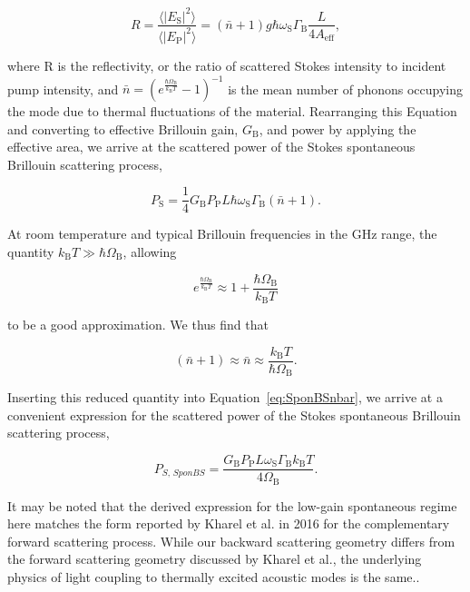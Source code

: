 \begin{equation}
  R = \frac{\langle|E_{\mathrm{S}}|^{2}\rangle}{\langle|E_{\mathrm{P}}|^{2}\rangle} = (\bar{n} + 1)g\hbar\omega_{\mathrm{S}}\Gamma_{\mathrm{B}}\frac{L}{4A_{\mathrm{eff}}},
\end{equation}

where R is the reflectivity, or the ratio of scattered Stokes intensity to incident pump intensity, and \(\bar{n} = (e^{\frac{\hbar\Omega_{\mathrm{B}}}{k_{\mathrm{B}}T}} - 1)^{-1}\) is the mean number of phonons occupying the mode due to thermal fluctuations of the material. Rearranging this Equation and converting to effective Brillouin gain, \(G_{\mathrm{B}}\), and power by applying the effective area, we arrive at the scattered power of the Stokes spontaneous Brillouin scattering process,

\begin{equation}
  P_{\mathrm{S}} = \frac{1}{4}G_{\mathrm{B}}P_{\mathrm{P}}L\hbar\omega_{\mathrm{S}}\Gamma_{\mathrm{B}}(\bar{n} + 1).
  \label{eq:SponBSnbar}
\end{equation}

At room temperature and typical Brillouin frequencies in the GHz range, the quantity \(k_{\mathrm{B}}T \gg \hbar\Omega_{\mathrm{B}}\), allowing

\begin{equation}
e^{\frac{\hbar\Omega_{\mathrm{B}}}{k_{\mathrm{B}}T}} \approx 1 + \frac{\hbar\Omega_{\mathrm{B}}}{k_{\mathrm{B}}T}
\end{equation}

to be a good approximation. We thus find that

\begin{equation}
(\bar{n} + 1) \approx \bar{n} \approx \frac{k_{\mathrm{B}}T}{\hbar\Omega_{\mathrm{B}}}.
\end{equation}

Inserting this reduced quantity into Equation~\ref{eq:SponBSnbar}, we arrive at a convenient expression for the scattered power of the Stokes spontaneous Brillouin scattering process,

\begin{equation}
  P_{S, \,\textit{SponBS}} = \frac{G_{\mathrm{B}}P_{\mathrm{P}}L\omega_{\mathrm{S}}\Gamma_{\mathrm{B}}k_{\mathrm{B}}T}{4\Omega_{\mathrm{B}}}.
  \label{eq:sponBSscatteredPower}
\end{equation}

It may be noted that the derived expression for the low-gain spontaneous regime here matches the form reported by Kharel et al. in 2016 \cite{kharel2016noise} for the complementary forward scattering process. While our backward scattering geometry differs from the forward scattering geometry discussed by Kharel et al., the underlying physics of light coupling to thermally excited acoustic modes is the same..

